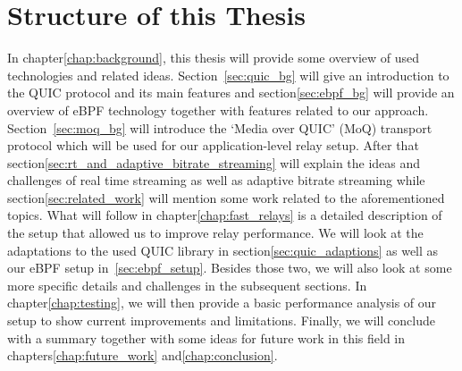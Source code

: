 \section{Structure of this Thesis}\label{sec:structure_of_thesis}

In chapter\nobreakspace\ref{chap:background}, this thesis will provide some overview of used technologies
and related ideas.
Section~\ref{sec:quic_bg} will give an introduction to the QUIC protocol and its main features and 
section\nobreakspace\ref{sec:ebpf_bg} will provide an overview of eBPF technology together with features related to 
our approach.
Section~\ref{sec:moq_bg} will introduce the `Media over QUIC' (MoQ) transport protocol which will be used 
for our application-level relay setup.
After that section\nobreakspace\ref{sec:rt_and_adaptive_bitrate_streaming} will explain the ideas and challenges of 
real time streaming as well as adaptive bitrate streaming while section\nobreakspace\ref{sec:related_work} will 
mention some work related to the aforementioned topics.
What will follow in chapter\nobreakspace\ref{chap:fast_relays} is a detailed description of the setup that 
allowed us to improve relay performance. 
We will look at the adaptations to the used QUIC library in section\nobreakspace\ref{sec:quic_adaptions} as well as 
our eBPF setup in~\ref{sec:ebpf_setup}. Besides those two, we will also look at some more specific details and 
challenges in the subsequent sections.
In chapter\nobreakspace\ref{chap:testing}, we will then provide a basic performance analysis of our setup to show current improvements and limitations.
Finally, we will conclude with a summary together with some ideas for future work in this field in chapters\nobreakspace\ref{chap:future_work} 
and\nobreakspace\ref{chap:conclusion}.